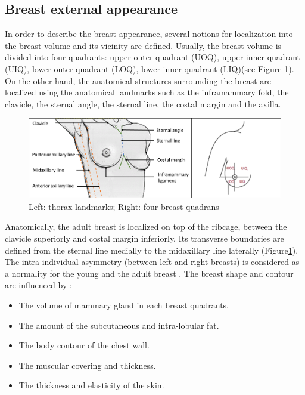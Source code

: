 \subsection{Breast external appearance}\label{subsection:breastappearance}

In order to describe the breast appearance, several notions for localization into the breast volume and its vicinity are defined. Usually, the breast volume is divided into four quadrants: upper outer quadrant (UOQ), upper inner quadrant (UIQ), lower outer quadrant (LOQ), lower inner quadrant (LIQ)(see Figure \ref{fig:Breast_quadrants_full}). On the other hand, the anatomical structures surrounding the breast are localized using the anatomical landmarks such as  the inframammary fold, the clavicle, the sternal angle, the sternal line, the costal margin and the axilla.

\begin{figure}[h]
\centering
 \includegraphics[width=\textwidth,keepaspectratio]{figures/Breast_quadrants_full.png}
  \caption{Left: thorax landmarks; Right: four breast quadrans \citep{vandeput2002considerations}}\label{fig:Breast_quadrants_full}
\end{figure}


 Anatomically, the adult breast is localized on top of the ribcage, between the clavicle superiorly and costal margin inferiorly. Its transverse boundaries are defined from the sternal line medially to the midaxillary line laterally (Figure\ref{fig:Breast_quadrants_full}). The intra-individual asymmetry (between left and right breasts) is considered as a normality for the young and the adult breast . The breast shape and contour are influenced by \citep{mugea2014aesthetic}:
 \begin{itemize}
 \item The volume of mammary gland in each breast quadrants.
 \item The amount of the subcutaneous and intra-lobular fat.
 \item The body contour of the chest wall.
 \item The muscular covering and thickness.
 \item The thickness and elasticity of the skin.
 \end{itemize}

